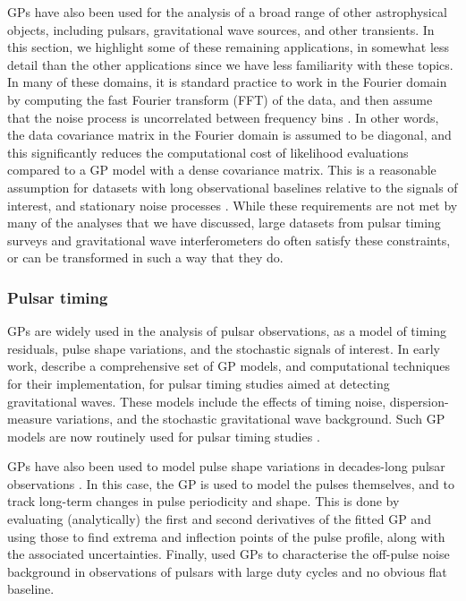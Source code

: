 \documentclass[letterpaper]{ar-1col}
\begin{document}
GPs have also been used for the analysis of a broad range of other astrophysical objects, including pulsars, gravitational wave sources, and other transients.
In this section, we highlight some of these remaining applications, in somewhat less detail than the other applications since we have less familiarity with these topics.
In many of these domains, it is standard practice to work in the Fourier domain by computing the fast Fourier transform (FFT) of the data, and then assume that the noise process is uncorrelated between frequency bins \citep[e.g.,][]{2017LRR....20....2R}.
In other words, the data covariance matrix in the Fourier domain is assumed to be diagonal, and this significantly reduces the computational cost of likelihood evaluations compared to a GP model with a dense covariance matrix.
This is a reasonable assumption for datasets with long observational baselines relative to the signals of interest, and stationary noise processes \citep[e.g.,][]{UNSER1984231}.
While these requirements are not met by many of the analyses that we have discussed, large datasets from pulsar timing surveys and gravitational wave interferometers do often satisfy these constraints, or can be transformed in such a way that they do.

\subsubsection{Pulsar timing} GPs are widely used in the analysis of pulsar observations, as a model of timing residuals, pulse shape variations, and the stochastic signals of interest.
In early work, \citet{2014PhRvD..90j4012V} describe a comprehensive set of GP models, and computational techniques for their implementation, for pulsar timing studies aimed at detecting gravitational waves.
These models include the effects of timing noise, dispersion-measure variations, and the stochastic gravitational wave background.
Such GP models are now routinely used for pulsar timing studies \citep[e.g.][]{2019MNRAS.489.3810P, 2020MNRAS.498.6044C, 2022MNRAS.510.4873A}.

GPs have also been used to model pulse shape variations in decades-long pulsar observations \citep{2016MNRAS.456.1374B,2019MNRAS.488.5702B,2022MNRAS.513.5861S}.
In this case, the GP is used to model the pulses themselves, and to track long-term changes in pulse periodicity and shape.
This is done by evaluating (analytically) the first and second derivatives of the fitted GP and using those to find extrema and inflection points of the pulse profile, along with the associated uncertainties.
Finally, \citet{2021MNRAS.508.4249P} used GPs to characterise the off-pulse noise background in observations of pulsars with large duty cycles and no obvious flat baseline.
\end{document}

